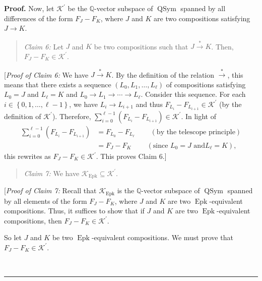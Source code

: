 \documentclass[numbers=enddot,12pt,final,onecolumn,notitlepage]{scrartcl}%
\theoremstyle{definition}
\newenvironment{statement}{\begin{quote}}{\end{quote}}
\newenvironment{proof}[1][Proof]{\noindent\textbf{#1.} }{\ \rule{0.5em}{0.5em}}
\newenvironment{verlong}{}{}
\let\sumnonlimits\sum
\renewcommand{\sum}{\sumnonlimits\limits}
\begin{document}
\begin{verlong}
\begin{proof}
Now, let $\mathcal{K}^{\prime}$ be the $\mathbb{Q}$-vector subspace of
$\operatorname*{QSym}$ spanned by all differences of the form $F_{J}-F_{K}$,
where $J$ and $K$ are two compositions satisfying $J\rightarrow K$.

\begin{statement}
\textit{Claim 6:} Let $J$ and $K$ be two compositions such that
$J\overset{\ast}{\rightarrow}K$. Then, $F_{J}-F_{K}\in\mathcal{K}^{\prime}$.
\end{statement}

[\textit{Proof of Claim 6:} We have $J\overset{\ast}{\rightarrow}K$. By the
definition of the relation $\overset{\ast}{\rightarrow}$, this means that
there exists a sequence $\left(  L_{0},L_{1},\ldots,L_{\ell}\right)  $ of
compositions satisfying $L_{0}=J$ and $L_{\ell}=K$ and $L_{0}\rightarrow
L_{1}\rightarrow\cdots\rightarrow L_{\ell}$. Consider this sequence. For each
$i\in\left\{  0,1,\ldots,\ell-1\right\}  $, we have $L_{i}\rightarrow L_{i+1}$
and thus $F_{L_{i}}-F_{L_{i+1}}\in\mathcal{K}^{\prime}$ (by the definition of
$\mathcal{K}^{\prime}$). Therefore, $\sum_{i=0}^{\ell-1}\left(  F_{L_{i}%
}-F_{L_{i+1}}\right)  \in\mathcal{K}^{\prime}$. In light of%
\begin{align*}
\sum_{i=0}^{\ell-1}\left(  F_{L_{i}}-F_{L_{i+1}}\right)   &  =F_{L_{0}%
}-F_{L_{\ell}}\ \ \ \ \ \ \ \ \ \ \left(  \text{by the telescope
principle}\right) \\
&  =F_{J}-F_{K}\ \ \ \ \ \ \ \ \ \ \left(  \text{since }L_{0}=J\text{ and
}L_{\ell}=K\right)  ,
\end{align*}
this rewrites as $F_{J}-F_{K}\in\mathcal{K}^{\prime}$. This proves Claim 6.]

\begin{statement}
\textit{Claim 7:} We have $\mathcal{K}_{\operatorname{Epk}}\subseteq
\mathcal{K}^{\prime}$.
\end{statement}

[\textit{Proof of Claim 7:} Recall that $\mathcal{K}_{\operatorname{Epk}}$ is
the $\mathbb{Q}$-vector subspace of $\operatorname*{QSym}$ spanned by all
elements of the form $F_{J}-F_{K}$, where $J$ and $K$ are two
$\operatorname{Epk}$-equivalent compositions. Thus, it suffices to show that
if $J$ and $K$ are two $\operatorname{Epk}$-equivalent compositions, then
$F_{J}-F_{K}\in\mathcal{K}^{\prime}$.

So let $J$ and $K$ be two $\operatorname{Epk}$-equivalent compositions. We
must prove that $F_{J}-F_{K}\in\mathcal{K}^{\prime}$.


\end{proof}
\end{verlong}
\end{document}
